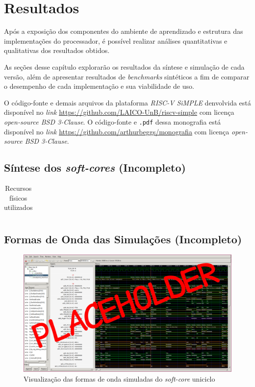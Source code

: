\chapter{Resultados}\label{cap4_resultados}

{ Após a exposição dos componentes do ambiente de aprendizado e estrutura das
    implementações do processador, é possível realizar análises quantitativas
    e qualitativas dos resultados obtidos.
}

{ As seções desse capítulo explorarão os resultados da síntese e simulação de
    cada versão, além de apresentar resultados de \textit{benchmarks} sintéticos
    a fim de comparar o desempenho de cada implementação e sua viabilidade de uso.
}

{ O código-fonte e demais arquivos da plataforma \textit{RISC-V SiMPLE} denvolvida
    está disponível no \textit{link} \url{https://github.com/LAICO-UnB/riscv-simple}
    com licença \textit{open-source BSD 3-Clause}. O código-fonte e \texttt{.pdf}
    dessa monografia está disponível no \textit{link} \url{https://github.com/arthurbeggs/monografia}
    com licença \textit{open-source BSD 3-Clause}.
}

\section{Síntese dos \textit{soft-cores} (Incompleto)}
    {
    }
    \begin{longtable}{|l|}
        \caption{Recursos físicos utilizados}\label{table:synth_resources}\\
        \hline
        \hline
        \endfirsthead
        \hline
        \hline
        \endhead
        \hline
    \end{longtable}

\section{Formas de Onda das Simulações (Incompleto)}
    {
    }

    \begin{figure}[H]
    \centering
        \includegraphics[width=0.9\linewidth]{../images/gtkwave/gtkwave_uni.png}
        \caption{Visualização das formas de onda simuladas do \textit{soft-core} uniciclo}
        \label{fig:gtkwave_uni}
    \end{figure}

